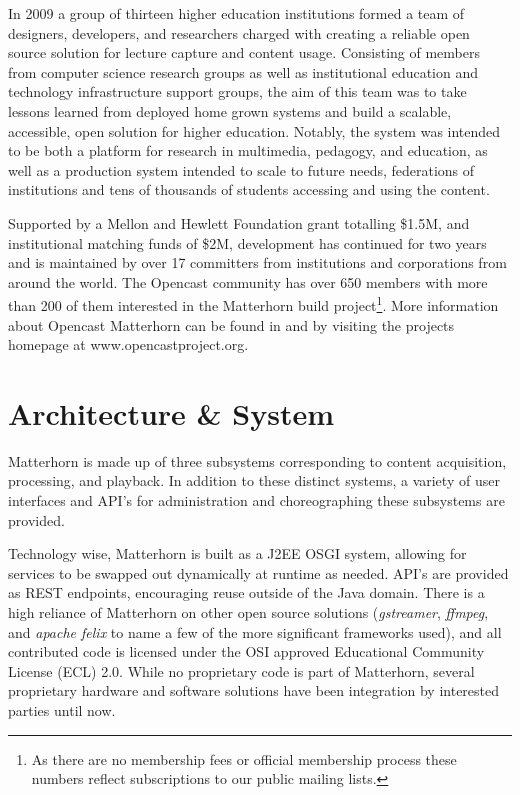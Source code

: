 \documentclass{sig-alternate}
\begin{document}
In 2009 a group of thirteen higher education institutions formed a team of designers, developers, and researchers charged with creating a reliable open source solution for lecture capture and content usage.  Consisting of members from computer science research groups as well as institutional education and technology infrastructure support groups, the aim of this team was to take lessons learned from deployed home grown systems and build a scalable, accessible, open solution for higher education.  Notably, the system was intended to be both a platform for research in multimedia, pedagogy, and education, as well as a production system intended to scale to future needs, federations of institutions and tens of thousands of students accessing and using the content.

Supported by a Mellon and Hewlett Foundation grant totalling \$1.5M, and institutional matching funds of \$2M, development has continued for two years and is maintained by over 17 committers from institutions and corporations from around the world.  The Opencast community has over 650 members with more than 200 of them interested in the Matterhorn build project\footnote{As there are no membership fees or official membership process these numbers reflect subscriptions to our public mailing lists.}. More information about Opencast Matterhorn can be found in \cite{DBLP:journals/itse/KetterlSH10} and by visiting the projects homepage at www.opencastproject.org. 

\section{Architecture \& System}
Matterhorn is made up of three subsystems corresponding to content acquisition, processing, and playback.  In addition to these distinct systems, a variety of user interfaces and API's for administration and choreographing these subsystems are provided.  

Technology wise, Matterhorn is built as a J2EE OSGI system, allowing for services to be swapped out dynamically at runtime as needed.  API's are provided as REST endpoints, encouraging reuse outside of the Java domain.  There is a high reliance of Matterhorn on other open source solutions (\emph{gstreamer}, \emph{ffmpeg}, and \emph{apache felix} to name a few of the more significant frameworks used), and all contributed code is licensed under the OSI approved Educational Community License (ECL) 2.0.  While no proprietary code is part of Matterhorn, several proprietary hardware and software solutions have been integration by interested parties until now.
\end{document}
